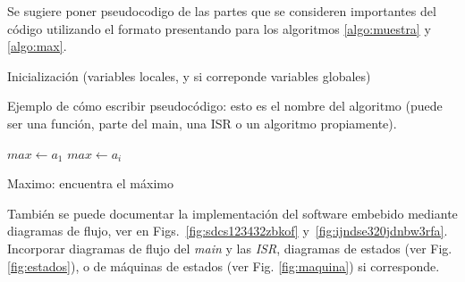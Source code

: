 \documentclass[a4paper,12pt]{article}
\begin{document}
\begin{linenumbers}
Se sugiere poner pseudocodigo de las partes que se consideren importantes del c\'odigo utilizando el formato presentando para los algoritmos \ref{algo:muestra} y \ref{algo:max}.

\begin{algorithm}[H]
\SetAlgoLined
{}
 Inicializaci\'on (variables locales, y si correponde variables globales)\;
 \caption{{\sc Ejemplo de cómo escribir pseudoc\'odigo:} esto es el nombre del algoritmo (puede ser una función, parte del main, una ISR o un algoritmo propiamente). }
  \label{algo:muestra}
\end{algorithm}
\vspace*{2pc}

\begin{algorithm}
\DontPrintSemicolon %
{}
$max \gets a_1$\;
 {
   {
    $max \gets a_i$\;
  }
}
\;
\caption{{\sc Maximo:} encuentra el máximo}
\label{algo:max}
\end{algorithm}

También se puede documentar la implementación del software embebido mediante diagramas de flujo, ver en Figs.~\ref{fig:sdcs123432zbkof} y~\ref{fig:ijndse320jdnbw3rfa}. Incorporar diagramas de flujo del \textit{main} y las \textit{ISR}, diagramas de estados (ver Fig. \ref{fig:estados}), o de m\'aquinas de estados (ver Fig. \ref{fig:maquina}) si corresponde. 



\end{linenumbers}
\end{document}

